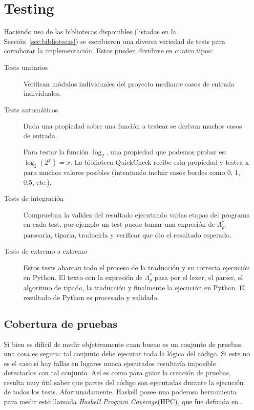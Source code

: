 \section{Testing}

Haciendo uso de las bibliotecas disponibles (listadas en la Sección~\ref{sec:bibliotecas}) se escribieron una diversa variedad de tests para corroborar la implementación. Estos pueden dividirse en cuatro tipos:
\begin{description}
    \item[Tests unitarios] Verifican módulos individuales del proyecto mediante casos de entrada individuales.
    \item[Tests automáticos] Dada una propiedad sobre una función a testear se derivan muchos casos de entrada.
\begin{ejemplo}
    Para testar la función $\log_2$, una propiedad que podemos probar es: $\log_2(2^x) = x$. La biblioteca QuickCheck recibe esta propiedad y testea x para muchos valores posibles (intentando incluir casos bordes como 0, 1, 0.5, etc.).
\end{ejemplo}
    \item[Tests de integración] Comprueban la validez del resultado ejecutando varias etapas del programa en cada test, por ejemplo un test puede tomar una expresión de $\Lambda_\rho^*$, parsearla, tiparla, traducirla y verificar que dio el resultado esperado.
    \item[Tests de extremo a extremo] Estos tests abarcan todo el proceso de la traducción y su correcta ejecución en Python. El texto con la expresión de $\Lambda_\rho^*$ pasa por el lexer, el parser, el algoritmo de tipado, la traducción y finalmente la ejecución en Python. El resultado de Python es procesado y validado.
\end{description}

\subsection{Cobertura de pruebas}
Si bien es difícil de medir objetivamente cuan bueno es un conjunto de pruebas, una cosa es segura: tal conjunto debe ejecutar toda la lógica del código. Si este no es el caso si hay fallas en lugares nunca ejecutados resultaría imposible detectarlos con tal conjunto. Así es como para guiar la creación de pruebas, resulta muy útil saber que partes del código son ejecutadas durante la ejecución de todos los tests. Afortunadamente, Haskell posee una poderosa herramienta para medir esto llamada \emph{Haskell Program Coverage}(HPC), que fue definida en \cite{hpc}.

